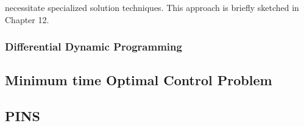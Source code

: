 necessitate specialized solution techniques. This approach is briefly sketched
in Chapter 12.
\fi

% 




\subsubsection{Differential Dynamic Programming}



\subsection{Minimum time Optimal Control Problem}


\subsection{PINS}

% 

